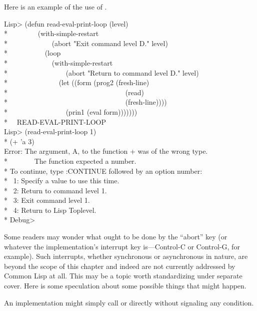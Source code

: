 \begin{defmac}
Here is an example of the use of .
\begin{lisp}
Lisp> (defun read-eval-print-loop (level) \\*
~~~~~~~~(with-simple-restart \\*
~~~~~~~~~~~~(abort "Exit command level {\Xtilde}D." level) \\*
~~~~~~~~~~(loop \\*
~~~~~~~~~~~~(with-simple-restart \\*
~~~~~~~~~~~~~~~~(abort "Return to command level {\Xtilde}D." level) \\*
~~~~~~~~~~~~~~(let ((form (prog2 (fresh-line) \\*
~~~~~~~~~~~~~~~~~~~~~~~~~~~~~~~~~(read) \\*
~~~~~~~~~~~~~~~~~~~~~~~~~~~~~~~~~(fresh-line)))) \\*
~~~~~~~~~~~~~~~~(prin1 (eval form))))))) \\*
~\EV\ READ-EVAL-PRINT-LOOP \\
Lisp> (read-eval-print-loop 1) \\*
(+ 'a 3) \\
Error: The argument, A, to the function + was of the wrong type. \\*
~~~~~~~The function expected a number. \\*
To continue, type :CONTINUE followed by an option number: \\*
~1: Specify a value to use this time. \\*
~2: Return to command level 1. \\*
~3: Exit command level 1. \\*
~4: Return to Lisp Toplevel. \\*
Debug> 
\end{lisp}

\beforenoterule
\begin{sideremark}
    Some readers may wonder what ought to be done by the ``abort'' key (or whatever
    the implementation's interrupt key is---Control-C or Control-G, 
    for example). Such interrupts, whether synchronous or asynchronous
    in nature, are beyond the scope of this chapter and indeed are not currently
    addressed by Common Lisp at all. This may be a topic
    worth standardizing under separate cover. Here is some speculation
    about some possible things that might happen.

    An implementation might simply call  or  directly
    without signaling any condition.


\end{sideremark}
\end{defmac}
